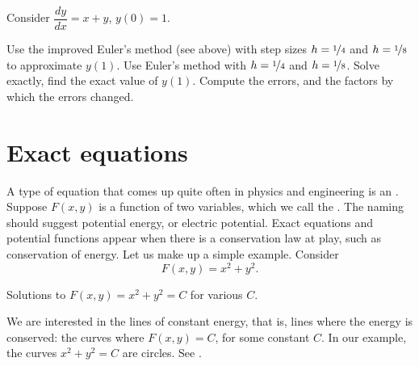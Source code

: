 \begin{exercise}
Consider $\dfrac{dy}{dx} = x+y$, $y(0)=1$.
\begin{tasks}
\task Use the improved Euler's method (see above) with step sizes $h=\nicefrac{1}{4}$ and $h=\nicefrac{1}{8}$
to approximate $y(1)$.
\task Use Euler's method with
$h=\nicefrac{1}{4}$ and $h=\nicefrac{1}{8}$.
\task Solve exactly, find the exact value of
$y(1)$.
\task Compute the errors, and the factors by which the errors changed.
\end{tasks}
\end{exercise}


\sectionnewpage
\section{Exact equations}
\label{exact:section}


A type of equation that comes up quite often in physics and
engineering is an
\emph{}.
Suppose $F(x,y)$ is a function of two variables, which we call the
\emph{}.  The naming should suggest 
potential energy, or electric potential.  Exact equations and potential
functions appear when there is a conservation law at play, such as 
conservation of energy.
Let us make up a simple example.  Consider
\begin{equation*}
F(x,y) = x^2+y^2 .
\end{equation*}

\begin{mywrapfig}[16]{3.25in}
\capstart
{}
\caption{Solutions to $F(x,y) = x^2+y^2 = C$ for various
$C$.\label{exact:circlesfig}}
\end{mywrapfig}
We are interested in the lines of constant energy, that is, lines where
the energy is conserved:  the curves where $F(x,y) = C$,
for some constant $C$.  In
our example, the curves $x^2+y^2=C$ are circles.  See
.

